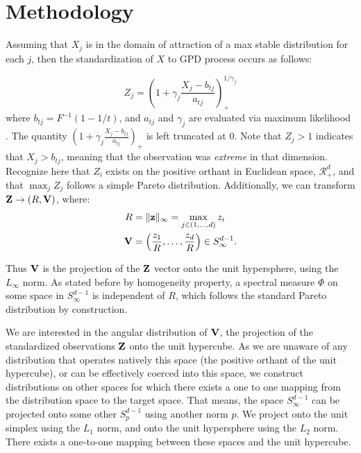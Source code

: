 \section{Methodology}
Assuming that $X_j$ is in the domain of attraction of a max stable distribution
  for each $j$, then the standardization of $X$ to GPD process occurs as follows:

\begin{equation}
Z_{j} = \left(1 + \gamma_j\frac{X_{j} - b_{tj}}{a_{tj}}\right)_{+}^{1/\gamma_j}
\end{equation}
where $b_{tj} = F^{-1}(1-1/t)$, and $a_{tj}$ and $\gamma_{j}$ are evaluated via
  maximum likelihood .  The quantity
  $\left(1 + \gamma_j\frac{X_{j} - b_{tj}}{a_{tj}}\right)_+$ is left truncated
  at 0.  Note that $Z_j > 1$ indicates that $X_{j} > b_{tj}$, meaning that the
  observation was \emph{extreme} in that dimension.  Recognize here that $Z_i$
  exists on the positive orthant in Euclidean space, $\mathcal{R}_+^d$, and
  that $\max_jZ_j$ follows a simple Pareto distribution.  Additionally, we can
  transform ${\bf Z} \rightarrow (R, {\bf V})$, where:
\begin{equation}
  \begin{aligned}
    R &= \lVert {\bf z} \rVert_{\infty} = \max_{j \in (1,\ldots,d)} z_i\\
    {\bf V} &= \left(\frac{z_1}{R},\ldots,\frac{z_d}{R}\right) \in S_{\infty}^{d-1}.\\
  \end{aligned}
\end{equation}

Thus ${\bf V}$ is the projection of the ${\bf Z}$ vector onto the unit
  hypersphere, using the $L_{\infty}$ norm.  As stated before by homogeneity
  property, a spectral measure $\Phi$ on some space in $S_{\infty}^{d-1}$ is
  independent of $R$, which follows the standard Pareto distribution by
  construction.

We are interested in the angular distribution of ${\bf V}$, the projection of
  the standardized observations ${\bf Z}$ onto the unit hypercube.  As we are
  unaware of any distribution that operates natively this space (the positive
  orthant of the unit hypercube), or can be effectively coerced into this space,
  we construct distributions on other spaces for which there exists a one to
  one mapping from the distribution space to the target space.  That means,
  the space $S_{\infty}^{d-1}$ can be projected onto some other $S_p^{d-1}$
  using another norm $p$.  We project onto the unit simplex using the $L_1$
  norm, and onto the unit hypersphere using the $L_2$ norm.  There exists a
  one-to-one mapping between these spaces and the unit hypercube.

